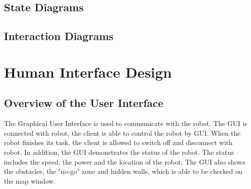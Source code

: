 \documentclass[11pt, a4paper]{report}
\begin{document}
\section{State Diagrams}


\section{Interaction Diagrams}


\pagebreak


\chapter{Human Interface Design}%
\label{cha:HID}

\section{Overview of the User Interface}
The Graphical User Interface is used to communicate with the robot. The GUI is connected with robot, the client is able to control the robot by GUI. When the robot finishes its task, the client is allowed to switch off and disconnect with robot. In addition, the GUI demonstrates the status of the robot. The status includes the speed, the power and the location of the robot. The GUI also shows the obstacles, the "no-go" zone and hidden walls, which is able to be checked on the map window.\\
\end{document}
